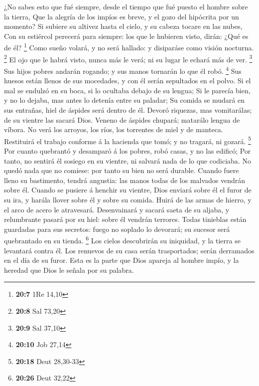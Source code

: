  ¿No sabes esto que fué siempre, desde el tiempo que fué
puesto el hombre sobre la tierra,  Que la alegría de los
impíos es breve, y el gozo del hipócrita por un momento?  Si
subiere su altivez hasta el cielo, y su cabeza tocare en las nubes,
 Con su estiércol perecerá para siempre: los que le hubieren
visto, dirán: ¿Qué es de él? \footnote{\textbf{20:7} 1Re 14,10}
 Como sueño volará, y no será hallado: y disiparáse como
visión nocturna. \footnote{\textbf{20:8} Sal 73,20}  El ojo
que le habrá visto, nunca más le verá; ni su lugar le echará más de ver.
\footnote{\textbf{20:9} Sal 37,10}  Sus hijos pobres
andarán rogando; y sus manos tornarán lo que él robó. \footnote{\textbf{20:10}
  Job 27,14}  Sus huesos están llenos de sus mocedades, y
con él serán sepultados en el polvo.  Si el mal se endulzó
en su boca, si lo ocultaba debajo de su lengua;  Si le
parecía bien, y no lo dejaba, mas antes lo detenía entre su paladar;
 Su comida se mudará en sus entrañas, hiel de áspides será
dentro de él.  Devoró riquezas, mas vomitarálas; de su
vientre las sacará Dios.  Veneno de áspides chupará;
matarálo lengua de víbora.  No verá los arroyos, los ríos,
los torrentes de miel y de manteca.  Restituirá el trabajo
conforme á la hacienda que tomó; y no tragará, ni gozará. \footnote{\textbf{20:18}
  Deut 28,30-33}  Por cuanto quebrantó y desamparó á los
pobres, robó casas, y no las edificó;  Por tanto, no
sentirá él sosiego en su vientre, ni salvará nada de lo que codiciaba.
 No quedó nada que no comiese: por tanto su bien no será
durable.  Cuando fuere lleno su bastimento, tendrá
angustia: las manos todas de los malvados vendrán sobre él.
 Cuando se pusiere á henchir su vientre, Dios enviará sobre
él el furor de su ira, y harála llover sobre él y sobre su comida.
 Huirá de las armas de hierro, y el arco de acero le
atravesará.  Desenvainará y sacará saeta de su aljaba, y
relumbrante pasará por su hiel: sobre él vendrán terrores. 
Todas tinieblas están guardadas para sus secretos: fuego no soplado lo
devorará; su sucesor será quebrantado en su tienda. \footnote{\textbf{20:26}
  Deut 32,22}  Los cielos descubrirán su iniquidad, y la
tierra se levantará contra él.  Los renuevos de su casa
serán trasportados; serán derramados en el día de su furor.
 Esta es la parte que Dios apareja al hombre impío, y la
heredad que Dios le señala por su palabra.

